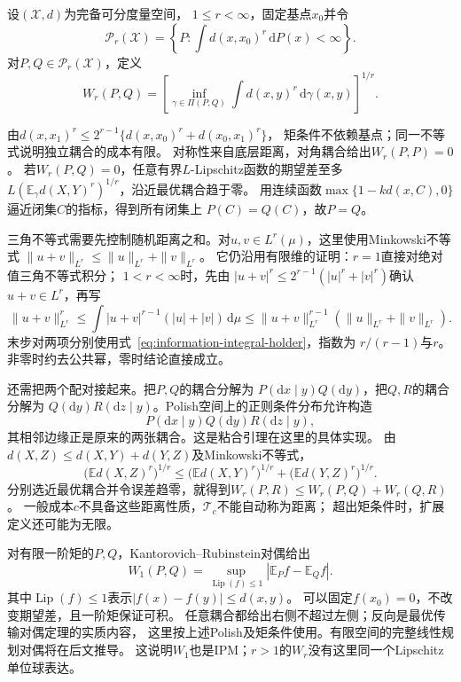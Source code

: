 \begin{definition}[Wasserstein距离]
\label{def:information-wasserstein-distance}
设\((\mathcal X,d)\)为完备可分度量空间，
\(1\leq r<\infty\)，固定基点\(x_0\)并令
\[
  \mathcal P_r(\mathcal X)=
   \left\{P:\int d(x,x_0)^r\,\mathrm dP(x)<\infty\right\}.
\]
对\(P,Q\in\mathcal P_r(\mathcal X)\)，定义
\begin{equation}
  W_r(P,Q)=\left[
    \inf_{\gamma\in\Pi(P,Q)}\int d(x,y)^r\,\mathrm d\gamma(x,y)
  \right]^{1/r}.
  \label{eq:information-wasserstein-distance}
\end{equation}
\end{definition}

由\(d(x,x_1)^r\leq2^{r-1}\{d(x,x_0)^r+d(x_0,x_1)^r\}\)，
矩条件不依赖基点；同一不等式说明独立耦合的成本有限。
对称性来自底层距离，对角耦合给出\(W_r(P,P)=0\)。
若\(W_r(P,Q)=0\)，任意有界\(L\)-Lipschitz函数的期望差至多
\(L(\mathbb E_\gamma d(X,Y)^r)^{1/r}\)，沿近最优耦合趋于零。
用连续函数\(\max\{1-kd(x,C),0\}\)逼近闭集\(C\)的指标，得到所有闭集上
\(P(C)=Q(C)\)，故\(P=Q\)。

三角不等式需要先控制随机距离之和。对\(u,v\in L^r(\mu)\)，这里使用Minkowski不等式
\(\|u+v\|_{L^r}\leq\|u\|_{L^r}+\|v\|_{L^r}\)。
它仍沿用有限维的证明：\(r=1\)直接对绝对值三角不等式积分；
\(1<r<\infty\)时，先由
\(|u+v|^r\leq2^{r-1}(|u|^r+|v|^r)\)确认\(u+v\in L^r\)，再写
\[
 \|u+v\|_{L^r}^r
 \leq\int|u+v|^{r-1}(|u|+|v|)\,\mathrm d\mu
 \leq\|u+v\|_{L^r}^{r-1}(\|u\|_{L^r}+\|v\|_{L^r}).
\]
末步对两项分别使用式~\eqref{eq:information-integral-holder}，指数为
\(r/(r-1)\)与\(r\)。非零时约去公共幂，零时结论直接成立。

还需把两个配对接起来。把\(P,Q\)的耦合分解为
\(P(\mathrm dx\mid y)Q(\mathrm dy)\)，把\(Q,R\)的耦合分解为
\(Q(\mathrm dy)R(\mathrm dz\mid y)\)。Polish空间上的正则条件分布允许构造
\[
  P(\mathrm dx\mid y)Q(\mathrm dy)R(\mathrm dz\mid y),
\]
其相邻边缘正是原来的两张耦合。这是粘合引理在这里的具体实现。
由\(d(X,Z)\leq d(X,Y)+d(Y,Z)\)及Minkowski不等式，
\[
  \bigl(\mathbb E d(X,Z)^r\bigr)^{1/r}
  \leq\bigl(\mathbb E d(X,Y)^r\bigr)^{1/r}
       +\bigl(\mathbb E d(Y,Z)^r\bigr)^{1/r}.
\]
分别选近最优耦合并令误差趋零，就得到\(W_r(P,R)\leq W_r(P,Q)+W_r(Q,R)\)。
一般成本\(c\)不具备这些距离性质，\(\mathcal T_c\)不能自动称为距离；
超出矩条件时，扩展定义还可能为无限。

对有限一阶矩的\(P,Q\)，Kantorovich--Rubinstein对偶给出
\begin{equation}
  W_1(P,Q)=\sup_{\operatorname{Lip}(f)\leq1}
                         |\mathbb E_Pf-\mathbb E_Qf|.
  \label{eq:information-kr-duality}
\end{equation}
其中\(\operatorname{Lip}(f)\leq1\)表示\(|f(x)-f(y)|\leq d(x,y)\)。
可以固定\(f(x_0)=0\)，不改变期望差，且一阶矩保证可积。
任意耦合都给出右侧不超过左侧；反向是最优传输对偶定理的实质内容，
这里按上述Polish及矩条件使用。有限空间的完整线性规划对偶将在后文推导。
这说明\(W_1\)也是IPM；\(r>1\)的\(W_r\)没有这里同一个Lipschitz单位球表达。

